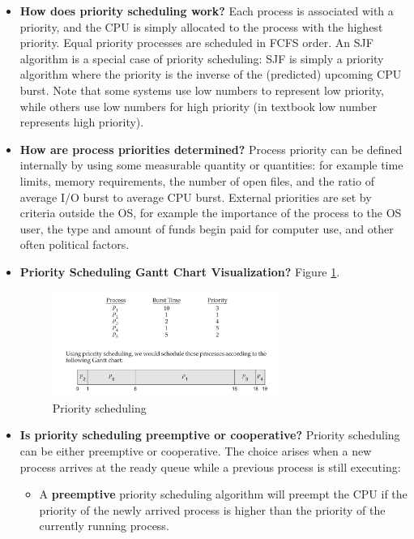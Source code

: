 \documentclass[12pt]{article}
\begin{document}
\begin{itemize}
    \item \textbf{How does priority scheduling work?} Each process is associated with a priority, and the CPU is simply allocated to the process with the highest priority. Equal priority processes are scheduled in FCFS order. An SJF algorithm is a special case of priority scheduling: SJF is simply a priority algorithm where the priority is the inverse of the (predicted) upcoming CPU burst. Note that some systems use low numbers to represent low priority, while others use low numbers for high priority (in textbook low number represents high priority).
    \item \textbf{How are process priorities determined?} Process priority can be defined internally by using some measurable quantity or quantities: for example time limits, memory requirements, the number of open files, and the ratio of average I/O burst to average CPU burst. External priorities are set by criteria outside the OS, for example the importance of the process to the OS user, the type and amount of funds begin paid for computer use, and other often political factors.
    \item \textbf{Priority Scheduling Gantt Chart Visualization?} Figure \ref{fig:priority-scheduling}.
        \begin{figure}[ht]
            \centering
            \includegraphics[width=0.7\textwidth]{figures/priority-scheduling.png}
            \caption{Priority scheduling}
            \label{fig:priority-scheduling}
        \end{figure}
    \item \textbf{Is priority scheduling preemptive or cooperative?} Priority scheduling can be either preemptive or cooperative. The choice arises when a new process arrives at the ready queue while a previous process is still executing:
        \begin{itemize}
            \item A \textbf{preemptive} priority scheduling algorithm will preempt the CPU if the priority of the newly arrived process is higher than the priority of the currently running process.

\end{itemize}
\end{itemize}
\end{document}
